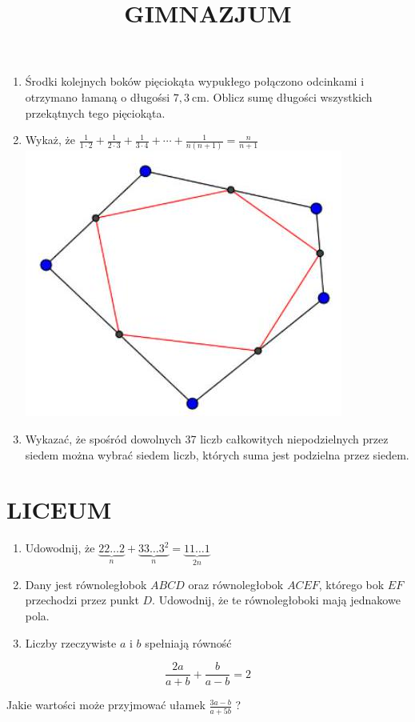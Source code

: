 \documentclass[10pt]{article}
\title{GIMNAZJUM }
\author{}
\date{}
\begin{document}
\maketitle
\begin{enumerate}
  \item Środki kolejnych boków pięciokąta wypukłego połączono odcinkami i otrzymano łamaną o długośsi \(7,3 \mathrm{~cm}\). Oblicz sumę długości wszystkich przekątnych tego pięciokąta.
  \item Wykaż, że \(\frac{1}{1 \cdot 2}+\frac{1}{2 \cdot 3}+\frac{1}{3 \cdot 4}+\cdots+\frac{1}{n(n+1)}=\frac{n}{n+1}\)\\
\includegraphics[max width=\textwidth, center]{2024_11_21_867f497540a78012e3fbg-1}
  \item Wykazać, że spośród dowolnych 37 liczb całkowitych niepodzielnych przez siedem można wybrać siedem liczb, których suma jest podzielna przez siedem.
\end{enumerate}

\section*{LICEUM}
\begin{enumerate}
  \item Udowodnij, że \(\underbrace{22 \ldots 2}_{n}+\underbrace{33 \ldots 3^{2}}_{n}=\underbrace{11 \ldots 1}_{2 n}\)
  \item Dany jest równoległobok \(A B C D\) oraz równoległobok \(A C E F\), którego bok \(E F\) przechodzi przez punkt \(D\). Udowodnij, że te równoległoboki mają jednakowe pola.
  \item Liczby rzeczywiste \(a\) i \(b\) spełniają równość
\end{enumerate}

\[
\frac{2 a}{a+b}+\frac{b}{a-b}=2
\]

Jakie wartości może przyjmować ułamek \(\frac{3 a-b}{a+5 b}\) ?
\end{document}
